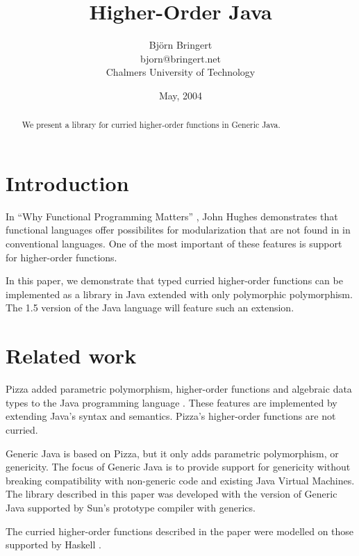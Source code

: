 \documentclass{article}
\begin{document}
\title{Higher-Order Java}

\author{Bj\"orn Bringert \\
bjorn@bringert.net \\
Chalmers University of Technology}

\date{May, 2004}

\maketitle

\begin{abstract}
We present a library for curried higher-order functions in Generic Java.
\end{abstract}

\section{Introduction}
In ``Why Functional Programming Matters'' \cite{hughes:matters-cj}, 
John Hughes demonstrates that functional languages offer possibilites
for modularization that are not found in in conventional languages.
One of the most important of these features is support for 
higher-order functions. 

In this paper, we demonstrate that typed curried higher-order functions can be
implemented as a library in Java extended with only polymorphic polymorphism.
The 1.5 version of the Java language will feature such an extension.

\section{Related work}

Pizza \cite{odersky97pizza} added parametric polymorphism, 
higher-order functions and algebraic data types to the Java 
programming language \cite{java}. These features are implemented by extending
Java's syntax and semantics. Pizza's higher-order functions are not 
curried.

Generic Java \cite{gj} is based on Pizza, but it only adds parametric
polymorphism, or genericity. The focus of Generic Java is to provide
support for genericity without breaking compatibility with non-generic
code and existing Java Virtual Machines. The library described in this
paper was developed with the version of Generic Java supported by
Sun's prototype compiler with generics.

The curried higher-order functions described in the paper were modelled
on those supported by Haskell \cite{haskell98revised}. 
\end{document}
